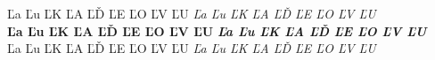 ﻿\documentclass[12pt,a4paper,twoside]{article}
\begin{document}
\noindent Ľa Ľu ĽK ĽA ĽĎ ĽE ĽO ĽV ĽU \textit{Ľa Ľu ĽK ĽA ĽĎ ĽE ĽO ĽV ĽU}\\
\textbf{Ľa Ľu ĽK ĽA ĽĎ ĽE ĽO ĽV ĽU} \textit{\textbf{Ľa Ľu ĽK ĽA ĽĎ ĽE ĽO ĽV ĽU}}\\
{\crimsonbold Ľa Ľu ĽK ĽA ĽĎ ĽE ĽO ĽV ĽU} {\crimsonbold\textit{Ľa Ľu ĽK ĽA ĽĎ ĽE ĽO ĽV ĽU}}
\end{document}

